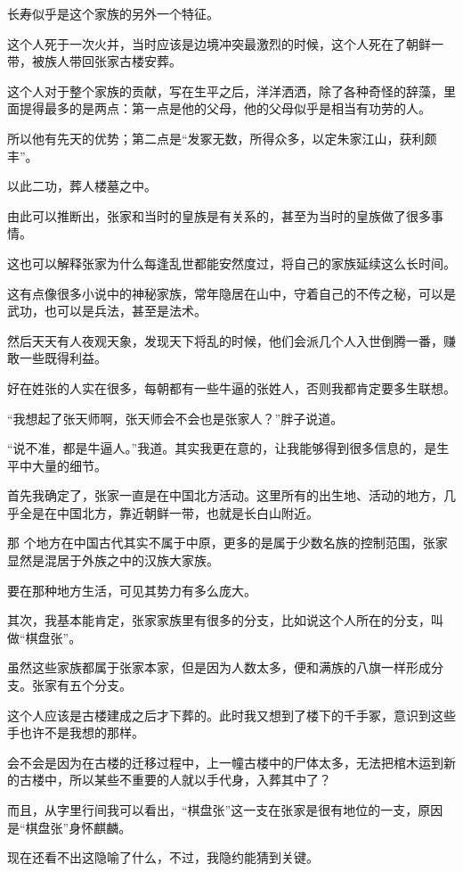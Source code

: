 长寿似乎是这个家族的另外一个特征。

这个人死于一次火并，当时应该是边境冲突最激烈的时候，这个人死在了朝鲜一带，被族人带回张家古楼安葬。

这个人对于整个家族的贡献，写在生平之后，洋洋洒洒，除了各种奇怪的辞藻，里面提得最多的是两点：第一点是他的父母，他的父母似乎是相当有功劳的人。

所以他有先天的优势；第二点是“发冢无数，所得众多，以定朱家江山，获利颇丰”。

以此二功，葬人楼墓之中。

由此可以推断出，张家和当时的皇族是有关系的，甚至为当时的皇族做了很多事情。

这也可以解释张家为什么每逢乱世都能安然度过，将自己的家族延续这么长时间。

这有点像很多小说中的神秘家族，常年隐居在山中，守着自己的不传之秘，可以是武功，也可以是兵法，甚至是法术。

然后天天有人夜观天象，发现天下将乱的时候，他们会派几个人入世倒腾一番，赚敢一些既得利益。

好在姓张的人实在很多，每朝都有一些牛逼的张姓人，否则我都肯定要多生联想。

“我想起了张天师啊，张天师会不会也是张家人？”胖子说道。

“说不准，都是牛逼人。”我道。其实我更在意的，让我能够得到很多信息的，是生平中大量的细节。

首先我确定了，张家一直是在中国北方活动。这里所有的出生地、活动的地方，几乎全是在中国北方，靠近朝鲜一带，也就是长白山附近。

那  个地方在中国古代其实不属于中原，更多的是属于少数名族的控制范围，张家显然是混居于外族之中的汉族大家族。

要在那种地方生活，可见其势力有多么庞大。

其次，我基本能肯定，张家家族里有很多的分支，比如说这个人所在的分支，叫做“棋盘张”。

虽然这些家族都属于张家本家，但是因为人数太多，便和满族的八旗一样形成分支。张家有五个分支。

这个人应该是古楼建成之后才下葬的。此时我又想到了楼下的千手冢，意识到这些手也许不是我想的那样。

会不会是因为在古楼的迁移过程中，上一幢古楼中的尸体太多，无法把棺木运到新的古楼中，所以某些不重要的人就以手代身，入葬其中了？

而且，从字里行间我可以看出，“棋盘张”这一支在张家是很有地位的一支，原因是“棋盘张”身怀麒麟。

现在还看不出这隐喻了什么，不过，我隐约能猜到关键。

